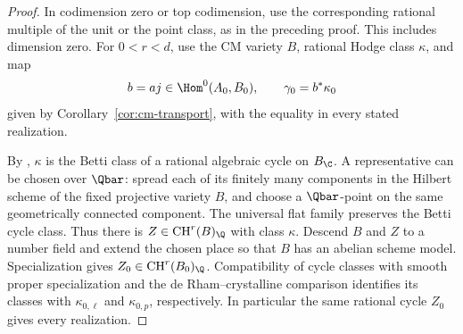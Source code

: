 \begin{proof}
In codimension zero or top codimension, use the corresponding rational
multiple of the unit or the point class, as in the preceding proof.
This includes dimension zero.  For $0<r<d$, use the CM variety $B$,
rational Hodge class $\kappa$, and map
\[
 b=aj\in\Hom^0(A_0,B_0),\qquad \gamma_0=b^*\kappa_0
\]
given by Corollary~\ref{cor:cm-transport}, with the equality in every
stated realization.

By \cite[Theorem~1.1]{OpenAICMHodge2026}, \(\kappa\) is the
Betti class of a rational algebraic cycle on \(B_{\C}\). A
representative can be chosen over \(\Qbar\): spread each of its
finitely many components in the Hilbert scheme of the fixed projective
variety \(B\), and choose a \(\Qbar\)-point on the same
geometrically connected component. The universal flat family preserves
the Betti cycle class. Thus there is
\(Z\in\operatorname{CH}^r(B)_{\Q}\) with class \(\kappa\).
Descend \(B\) and \(Z\) to a number field and extend the chosen
place so that \(B\) has an abelian scheme model. Specialization gives
\(Z_0\in\operatorname{CH}^r(B_0)_{\Q}\). Compatibility of
cycle classes with smooth proper specialization and the
de Rham--crystalline comparison identifies its classes with
\(\kappa_{0,\ell}\) and \(\kappa_{0,p}\), respectively.
In particular the same rational cycle \(Z_0\) gives every realization.


\end{proof}
